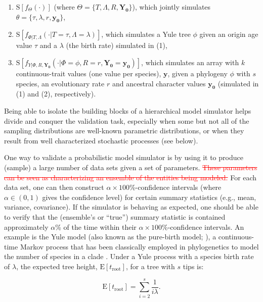 \documentclass[oneside]{article}
\begin{document}
\begin{enumerate}
  \item $\text{S}[f_\Theta(\cdot)]$ (where $\Theta = \{T,\Lambda, R, \boldsymbol{Y_0}\}$), which jointly simulates $\theta=\{\tau,\lambda,r,\boldsymbol{y_0}\}$,
  \item $\text{S}[f_{\Phi|T,\Lambda}(\cdot|T=\tau,\Lambda=\lambda)]$, which simulates a Yule tree $\phi$ given an origin age value $\tau$ and a $\lambda$ (the birth rate) simulated in (1),
  \item $\text{S}[f_{Y|\Phi,R,\boldsymbol{Y_0}}(\cdot|\Phi=\phi,R=r,\boldsymbol{Y_0}=\boldsymbol{y_0})]$, which simulates an array with $k$ continuous-trait values (one value per species), $\boldsymbol{y}$, given a phylogeny $\phi$ with $s$ species, an evolutionary rate $r$ and ancestral character values $\boldsymbol{y_0}$ (simulated in (1) and (2), respectively).
\end{enumerate}

Being able to isolate the building blocks of a hierarchical model simulator helps divide and conquer the validation task, especially when some but not all of the sampling distributions are well-known parametric distributions, or when they result from well characterized stochastic processes (see below).

One way to validate a probabilistic model simulator is by using it to produce (sample) a large number of data sets given a set of parameters.
\textcolor{red}{\st{These parameters can be seen as characterizing an ensemble of the entities being modeled.}}
For each data set, one can then construct $\alpha \times 100 \%$-confidence intervals (where $\alpha \in (0,1)$ gives the confidence level) for certain summary statistics (e.g., mean, variance, covariance).
If the simulator is behaving as expected, one should be able to verify that the (ensemble's or ``true'') summary statistic is contained approximately $\alpha$\% of the time within their $\alpha \times 100\%$-confidence intervals.
An example is the Yule model (also known as the pure-birth model; \citealt{yule24}), a continuous-time Markov process that has been classically employed in phylogenetics to model the number of species in a clade \citep{yule24,aldous01}.
Under a Yule process with a species birth rate of $\lambda$, the expected tree height, $\text{E}[t_{\text{root}}]$, for a tree with $s$ tips is:

\begin{equation}
  \text{E}[t_{\text{root}}] = \sum_{i=2}^{s}\frac{1}{i\lambda}.
  \label{eq:yule}
\end{equation}
\end{document}
